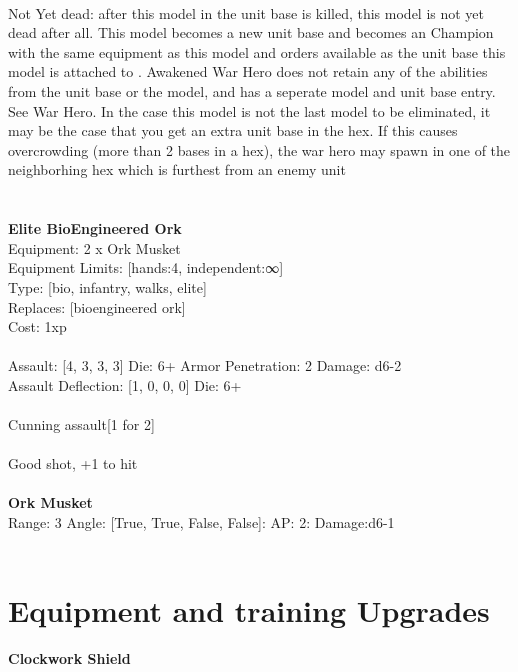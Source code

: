 \ \\
Not Yet dead: after this model in the unit base is killed, this model is not yet dead after all. This model becomes a new unit base and becomes an Champion with the same equipment as this model and orders available as the unit base this model is attached to . Awakened War Hero does not retain any of the abilities from the unit base or the model, and has a seperate model and unit base entry. See War Hero. In the case this model is not the last model to be eliminated, it may be the case that you get an extra unit base in the hex. If this causes overcrowding (more than 2 bases in a hex), the war hero may spawn in one of the neighborhing hex which is furthest from an enemy unit\\ 

\ \\
 
\ \\

{\bf Elite BioEngineered Ork } \\
Equipment: 2 x Ork Musket \\
Equipment Limits: [hands:4, independent:∞] \\
Type: [bio, infantry, walks, elite] \\
Replaces: [bioengineered ork] \\
Cost: 1xp\\
\ \\
Assault: [4, 3, 3, 3] Die: 6+ Armor Penetration: 2 Damage: d6-2 \\
Assault Deflection: [1, 0, 0, 0] Die: 6+\\
\\ 
Cunning assault[1 for 2]\\ 
 
\ \\
Good shot, +1 to hit\\ 

\ \\
{\bf Ork Musket } \\



Range: 3  Angle: [True, True, False, False]: AP: 2: Damage:d6-1 \\




 
\ \\

\section{Equipment and training Upgrades}{\bf Clockwork Shield } \\

